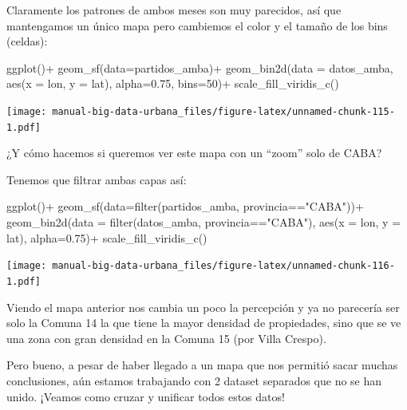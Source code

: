\documentclass[
  spanish,
]{book}
\newenvironment{Shaded}{\begin{snugshade}}{\end{snugshade}}
\newcommand{\AttributeTok}[1]{\textcolor[rgb]{0.77,0.63,0.00}{#1}}
\newcommand{\DecValTok}[1]{\textcolor[rgb]{0.00,0.00,0.81}{#1}}
\newcommand{\FloatTok}[1]{\textcolor[rgb]{0.00,0.00,0.81}{#1}}
\newcommand{\FunctionTok}[1]{\textcolor[rgb]{0.00,0.00,0.00}{#1}}
\newcommand{\NormalTok}[1]{#1}
\newcommand{\SpecialCharTok}[1]{\textcolor[rgb]{0.00,0.00,0.00}{#1}}
\newcommand{\StringTok}[1]{\textcolor[rgb]{0.31,0.60,0.02}{#1}}
\begin{document}
Claramente los patrones de ambos meses son muy parecidos, así que mantengamos un único mapa pero cambiemos el color y el tamaño de los bins (celdas):

\begin{Shaded}
\begin{Highlighting}[]
\FunctionTok{ggplot}\NormalTok{()}\SpecialCharTok{+}
  \FunctionTok{geom\_sf}\NormalTok{(}\AttributeTok{data=}\NormalTok{partidos\_amba)}\SpecialCharTok{+}
  \FunctionTok{geom\_bin2d}\NormalTok{(}\AttributeTok{data =}\NormalTok{ datos\_amba, }\FunctionTok{aes}\NormalTok{(}\AttributeTok{x =}\NormalTok{ lon, }\AttributeTok{y =}\NormalTok{ lat), }\AttributeTok{alpha=}\FloatTok{0.75}\NormalTok{, }\AttributeTok{bins=}\DecValTok{50}\NormalTok{)}\SpecialCharTok{+}
  \FunctionTok{scale\_fill\_viridis\_c}\NormalTok{()}
\end{Highlighting}
\end{Shaded}

\texttt{[image: manual-big-data-urbana\_files/figure-latex/unnamed-chunk-115-1.pdf]}

¿Y cómo hacemos si queremos ver este mapa con un ``zoom'' solo de CABA?

Tenemos que filtrar ambas capas así:

\begin{Shaded}
\begin{Highlighting}[]
\FunctionTok{ggplot}\NormalTok{()}\SpecialCharTok{+}
  \FunctionTok{geom\_sf}\NormalTok{(}\AttributeTok{data=}\FunctionTok{filter}\NormalTok{(partidos\_amba, provincia}\SpecialCharTok{==}\StringTok{"CABA"}\NormalTok{))}\SpecialCharTok{+}
  \FunctionTok{geom\_bin2d}\NormalTok{(}\AttributeTok{data =} \FunctionTok{filter}\NormalTok{(datos\_amba, provincia}\SpecialCharTok{==}\StringTok{"CABA"}\NormalTok{), }\FunctionTok{aes}\NormalTok{(}\AttributeTok{x =}\NormalTok{ lon, }\AttributeTok{y =}\NormalTok{ lat), }\AttributeTok{alpha=}\FloatTok{0.75}\NormalTok{)}\SpecialCharTok{+}
  \FunctionTok{scale\_fill\_viridis\_c}\NormalTok{()}
\end{Highlighting}
\end{Shaded}

\texttt{[image: manual-big-data-urbana\_files/figure-latex/unnamed-chunk-116-1.pdf]}

Viendo el mapa anterior nos cambia un poco la percepción y ya no parecería ser solo la Comuna 14 la que tiene la mayor densidad de propiedades, sino que se ve una zona con gran densidad en la Comuna 15 (por Villa Crespo).

Pero bueno, a pesar de haber llegado a un mapa que nos permitió sacar muchas conclusiones, aún estamos trabajando con 2 dataset separados que no se han unido. ¡Veamos como cruzar y unificar todos estos datos!
\end{document}
